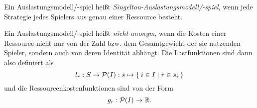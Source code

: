 \begin{defn}
	Ein Auslastungsmodell/-spiel heißt \emph{Singelton-Auslastungsmodell/-spiel}, wenn jede Strategie jedes Spielers aus genau einer Ressource besteht.
\end{defn}

\begin{defn}
	Ein Auslastungsmodell/-spiel heißt \emph{nicht-anonym}, wenn die Kosten einer Ressource nicht nur von der Zahl bzw. dem Gesamtgewicht der sie nutzenden Spieler, sondern auch von deren Identität abhängt. Die Lastfunktionen sind dann also definiert als
		\[l_r: S \to \mathcal{P}(I): s \mapsto \Set{i \in I | r \in s_i }\]
	und die Ressourcenkostenfunktionen sind von der Form
		\[g_r: \mathcal{P}(I) \to \mathbb{R}. \]
\end{defn}